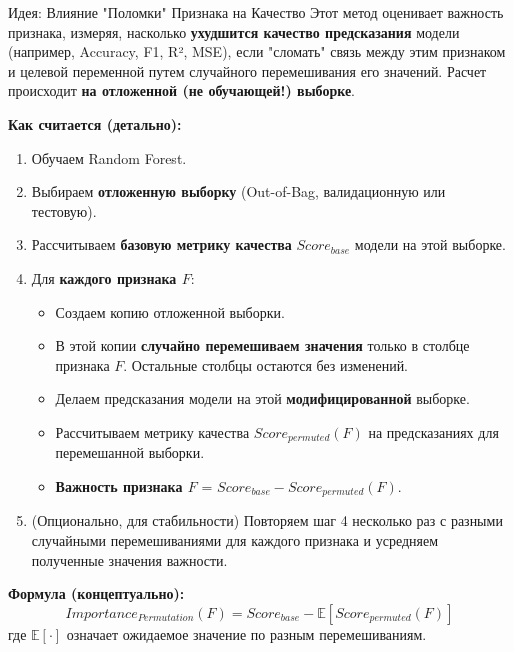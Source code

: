 \begin{myexampleblock}{Идея: Влияние "Поломки" Признака на Качество}
    Этот метод оценивает важность признака, измеряя, насколько \textbf{ухудшится качество предсказания} модели (например, Accuracy, F1, R², MSE), если "сломать" связь между этим признаком и целевой переменной путем случайного перемешивания его значений. Расчет происходит \textbf{на отложенной (не обучающей!) выборке}.

    \textbf{Как считается (детально):}
    \begin{enumerate}
        \item Обучаем Random Forest.
        \item Выбираем \textbf{отложенную выборку} (Out-of-Bag, валидационную или тестовую).
        \item Рассчитываем \textbf{базовую метрику качества} $Score_{base}$ модели на этой выборке.
        \item Для \textbf{каждого признака $F$}:
            \begin{itemize}
                \item Создаем копию отложенной выборки.
                \item В этой копии \textbf{случайно перемешиваем значения} только в столбце признака $F$. Остальные столбцы остаются без изменений.
                \item Делаем предсказания модели на этой \textbf{модифицированной} выборке.
                \item Рассчитываем метрику качества $Score_{permuted}(F)$ на предсказаниях для перемешанной выборки.
                \item \textbf{Важность признака $F$} = $Score_{base} - Score_{permuted}(F)$.
            \end{itemize}
        \item (Опционально, для стабильности) Повторяем шаг 4 несколько раз с разными случайными перемешиваниями для каждого признака и усредняем полученные значения важности.
    \end{enumerate}

    \textbf{Формула (концептуально):}
    \[
    Importance_{Permutation}(F) = Score_{base} - \mathbb{E}[Score_{permuted}(F)]
    \]
    где $\mathbb{E}[\cdot]$ означает ожидаемое значение по разным перемешиваниям.


\end{myexampleblock}
